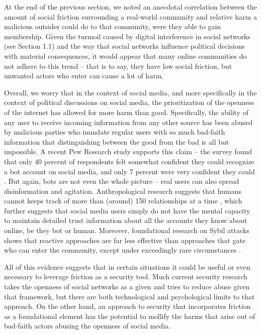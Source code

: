 \documentclass[sigconf,authordraft]{acmart}
\begin{document}
At the end of the previous section, we noted an anecdotal correlation between the amount of social friction surrounding a real-world community and relative harm a malicious outsider could do to that community, were they able to gain membership. Given the turmoil caused by digital interference in social networks (see Section 1.1) and the way that social networks influence political decisions with material consequences, it would appear that many online communities do not adhere to this trend -- that is to say, they have low social friction, but unwanted actors who enter can cause a lot of harm. 

Overall, we worry that in the context of social media, and more specifically in the context of political discussions on social media, the prioritization of the openness of the internet has allowed for more harm than good. Specifically, the ability of any user to receive incoming information from any other source has been abused by malicious parties who inundate regular users with so much bad-faith information that distinguishing between the good from the bad is all but impossible. A recent Pew Research study supports this claim -- the survey found that only 40 percent of respondents felt somewhat confident they could recognize a bot account on social media, and only 7 percent were very confident they could \cite{PewBotStudy}. But again, bots are not even the whole picture -- real users can also spread disinformation and agitation. Anthropological research suggests that humans cannot keeps track of more than (around) 150 relationships at a time \cite{zhou2005discrete}, which further suggests that social media users simply do not have the mental capacity to maintain detailed trust information about all the accounts they know about online, be they bot or human. Moreover, foundational research on Sybil attacks shows that reactive approaches are far less effective than approaches that gate who can enter the community, except under exceedingly rare circumstances \cite{douceur2002sybil}.

All of this evidence suggests that in certain situations it could be useful or even necessary to leverage friction as a security tool. Much current security research takes the openness of social networks as a given and tries to reduce abuse given that framework, but there are both technological \cite{douceur2002sybil} and psychological \cite{PewBotStudy,zhou2005discrete} limits to that approach. On the other hand, an approach to security that incorporates friction as a foundational element has the potential to mollify the harms that arise out of bad-faith actors abusing the openness of social media. 
\end{document}
